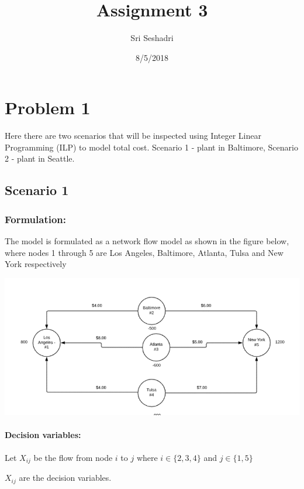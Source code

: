 \documentclass[]{article}
\title{Assignment 3}
\author{Sri Seshadri}
\date{8/5/2018}
\let\oldparagraph\paragraph
\renewcommand{\paragraph}[1]{\oldparagraph{#1}\mbox{}}
\begin{document}
\maketitle

\section{Problem 1}\label{problem-1}

Here there are two scenarios that will be inspected using Integer Linear
Programming (ILP) to model total cost. Scenario 1 - plant in Baltimore,
Scenario 2 - plant in Seattle.

\subsection{Scenario 1}\label{scenario-1}

\subsubsection{Formulation:}\label{formulation}

The model is formulated as a network flow model as shown in the figure
below, where nodes 1 through 5 are Los Angeles, Baltimore, Atlanta,
Tulsa and New York respectively

\begin{center}\includegraphics{Figures/Homework3/1aFig} \end{center}

\paragraph{Decision variables:}\label{decision-variables}

Let \(X_{ij}\) be the flow from node \(i\) to \(j\) where
\(i\in \{2,3,4\}\) and \(j \in \{1,5\}\)

\(X_{ij}\) are the decision variables.
\end{document}
